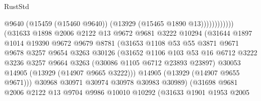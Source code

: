 \begin{lexlean}{RustStd}
\begin{coremodule}
                                              @9640
                                              (@15459 (@15460 @9640))
                                              (@13929 (@15465 @1890 @13))))))))))))
                          (@31633
                            @1898
                            @2006
                            @2122
                            @13
                            @9672
                            @9681
                            @3222
                            @10294
                            (@31644
                              @1897
                              @1014
                              @19390
                              @9672
                              @9679
                              @8781
                              (@31653
                                @1108
                                @53
                                @55
                                @3871
                                @9671
                                @9678
                                @3257
                                @9654
                                @3263
                                @30126
                                (@31652
                                  @1106
                                  @103
                                  @53
                                  @16
                                  @6712
                                  @3222
                                  @3236
                                  @3257
                                  @9664
                                  @3263
                                  (@30086 @1105 @6712 @23893 @23897)
                                  @30053
                                  @14905
                                  (@13929 (@14907 @9665 @3222)))
                                @14905
                                (@13929 (@14907 @9655 @9671)))
                              @30968
                              @30971
                              @30974
                              @30978
                              @30983
                              @30989)
                            (@31698
                              @9681
                              @2006
                              @2122
                              @13
                              @9704
                              @9986
                              @10010
                              @10292
                              (@31633
                                @1901
                                @1953
                                @2005

\end{coremodule}
\end{lexlean}
